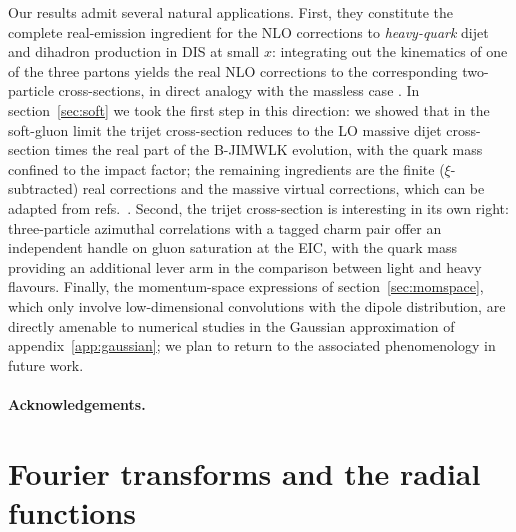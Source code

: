 \documentclass[11pt,a4paper]{article}
\numberwithin{equation}{section}
\begin{document}
Our results admit several natural applications. First, they constitute the complete
real-emission ingredient for the NLO corrections to \emph{heavy-quark} dijet and dihadron
production in DIS at small $x$: integrating out the kinematics of one of the three partons
yields the real NLO corrections to the corresponding two-particle cross-sections, in direct
analogy with the massless case \cite{Iancu:2022gpw,Bergabo:2022tcu,Caucal:2021ent}. In
section~\ref{sec:soft} we took the first step in this direction: we showed that in the
soft-gluon limit the trijet cross-section reduces to the LO massive dijet cross-section times
the real part of the B-JIMWLK evolution, with the quark mass confined to the impact factor;
the remaining ingredients are the finite ($\xi$-subtracted) real corrections and the massive
virtual corrections, which can be adapted from refs.~\cite{Beuf:2021qqa,Beuf:2022ndu}. Second,
the trijet cross-section is interesting in its own right: three-particle azimuthal
correlations with a tagged charm pair offer an independent handle on gluon saturation at the
EIC, with the quark mass providing an additional lever arm in the comparison between light
and heavy flavours. Finally, the momentum-space expressions of section~\ref{sec:momspace},
which only involve low-dimensional convolutions with the dipole distribution, are directly
amenable to numerical studies in the Gaussian approximation of appendix~\ref{app:gaussian};
we plan to return to the associated phenomenology in future work.

\paragraph{Acknowledgements.} %

\appendix

\section{Fourier transforms and the radial functions}
\label{app:fourier}
\end{document}
